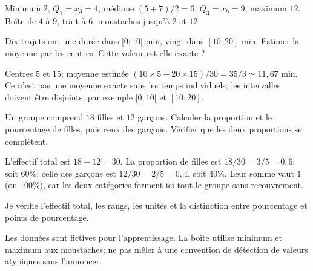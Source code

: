 \begin{corrige}\label{sol-t11s-c18-e06}
Minimum $2$, $Q_1=x_3=4$, médiane $(5+7)/2=6$, $Q_3=x_8=9$, maximum $12$. Boîte de $4$ à $9$, trait à $6$, moustaches jusqu’à $2$ et $12$.
\end{corrige}
\label{t11s-c18-e07}
Dix trajets ont une durée dans $[0;10[$ min, vingt dans $[10;20]$ min. Estimer la moyenne par les centres. Cette valeur est-elle exacte ?
\begin{corrige}\label{sol-t11s-c18-e07}
Centres $5$ et $15$; moyenne estimée $(10\times5+20\times15)/30=35/3\simeq11{,}67$ min. Ce n’est pas une moyenne exacte sans les temps individuels; les intervalles doivent être disjoints, par exemple $[0;10[$ et $[10;20]$.
\end{corrige}
\label{t11s-c18-e08}
Un groupe comprend $18$ filles et $12$ garçons. Calculer la proportion et le pourcentage de filles, puis ceux des garçons. Vérifier que les deux proportions se complètent.
\begin{corrige}\label{sol-t11s-c18-e08}
L’effectif total est $18+12=30$. La proportion de filles est $18/30=3/5=0{,}6$, soit $60\%$; celle des garçons est $12/30=2/5=0{,}4$, soit $40\%$. Leur somme vaut $1$ (ou $100\%$), car les deux catégories forment ici tout le groupe sans recouvrement.
\end{corrige}
\begin{jemeteste}Je vérifie l’effectif total, les rangs, les unités et la distinction entre pourcentage et points de pourcentage.\end{jemeteste}
\begin{notepourlaclasse}Les données sont fictives pour l’apprentissage. La boîte utilise minimum et maximum aux moustaches; ne pas mêler à une convention de détection de valeurs atypiques sans l’annoncer.\end{notepourlaclasse}
